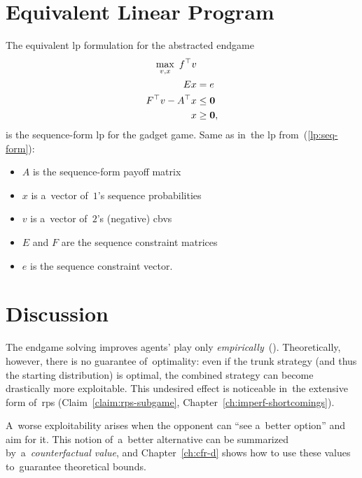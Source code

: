 \section{Equivalent Linear Program}
The equivalent \acrshort{lp} formulation for the abstracted endgame
\begin{equation*}
  \label{lp:endgame-solving}
  \begin{split}
    \max_{v, x}\  f^\top v & \\
    Ex &= e \\
    F^\top v - A^\top x &\le \boldsymbol{0} \\
    x &\ge \boldsymbol{0},
  \end{split}
\end{equation*}
is the sequence-form \acrshort{lp} for the gadget game.
Same as in~the \acrshort{lp} from~(\ref{lp:seq-form}):
\begin{itemize}
  \item $A$ is the sequence-form payoff matrix
  \item $x$ is a~vector of~$1$'s sequence probabilities
  \item $v$ is a~vector of~$2$'s (negative) \acrlong{cbv}s
  \item $E$ and $F$ are the sequence constraint matrices 
  \item $e$ is the sequence constraint vector.
\end{itemize}

\section{Discussion}
The endgame solving improves agents' play only \emph{empirically}~(\cite[Table~1]{Ganzfried2015endgame}).
Theoretically, however, there is no guarantee of~optimality:
even if the trunk strategy (and thus the starting distribution) is optimal, the combined strategy can become drastically more exploitable.
This undesired effect is noticeable in~the extensive form of~\acrshort{rps} (Claim~\ref{claim:rps-subgame}, Chapter~\ref{ch:imperf-shortcomings}).

A~worse exploitability arises when the opponent can ``see a~better option'' and aim for it.
This notion of~a~better alternative can be summarized by~a~\emph{counterfactual value}, and Chapter~\ref{ch:cfr-d} shows how to use these values to~guarantee theoretical bounds.
